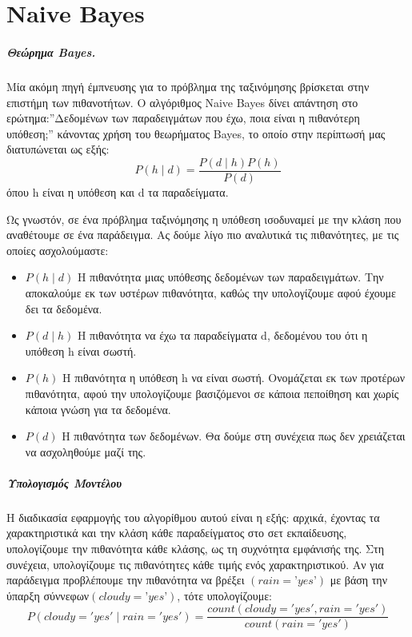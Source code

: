 \chapter{Naive Bayes}
\label{appendix:NBayes}
\paragraph{Θεώρημα Bayes.} Μία ακόμη πηγή έμπνευσης για το πρόβλημα της ταξινόμησης βρίσκεται στην επιστήμη των πιθανοτήτων. Ο αλγόριθμος Naive Bayes δίνει απάντηση στο ερώτημα:”Δεδομένων των
παραδειγμάτων που έχω, ποια είναι η πιθανότερη υπόθεση;” κάνοντας χρήση του θεωρήματος Bayes, το οποίο στην περίπτωσή μας διατυπώνεται ως εξής: 
$$P(h \mid d)= \frac{P(d \mid h) P(h)}{P(d)}$$
όπου h είναι η υπόθεση και d τα παραδείγματα.

Ως γνωστόν, σε ένα πρόβλημα ταξινόμησης η υπόθεση ισοδυναμεί με την κλάση που αναθέτουμε σε ένα παράδειγμα. Ας δούμε λίγο πιο αναλυτικά τις πιθανότητες, με τις οποίες ασχολούμαστε:
\begin{itemize}
	\item $P(h \mid d)$ Η πιθανότητα μιας υπόθεσης δεδομένων των παραδειγμάτων. Την αποκαλούμε εκ των υστέρων πιθανότητα, καθώς την υπολογίζουμε αφού έχουμε δει τα δεδομένα.
	\item $P(d \mid h)$ Η πιθανότητα να έχω τα παραδείγματα d, δεδομένου του ότι η υπόθεση h είναι σωστή.
	\item $P( h)$ Η πιθανότητα η υπόθεση h να είναι σωστή. Ονομάζεται εκ των προτέρων πιθανότητα, αφού την υπολογίζουμε βασιζόμενοι σε κάποια πεποίθηση και χωρίς κάποια γνώση για τα δεδομένα.
	\item $P(d)$ Η πιθανότητα των δεδομένων. Θα δούμε στη συνέχεια πως δεν χρειάζεται να ασχοληθούμε μαζί της.
\end{itemize}
\paragraph{Υπολογισμός Μοντέλου} Η διαδικασία εφαρμογής του αλγορίθμου αυτού είναι η εξής: αρχικά, έχοντας τα χαρακτηριστικά και την κλάση κάθε παραδείγματος στο σετ εκπαίδευσης, υπολογίζουμε την πιθανότητα κάθε κλάσης, ως τη συχνότητα εμφάνισής της. Στη συνέχεια, υπολογίζουμε τις πιθανότητες κάθε τιμής ενός χαρακτηριστικού. Αν για παράδειγμα προβλέπουμε την πιθανότητα να βρέξει $(rain=’yes’)$ με βάση την ύπαρξη σύννεφων$(cloudy=’yes’)$, τότε υπολογίζουμε:
$$P(cloudy= 'yes' \mid rain='yes')= \frac{count(cloudy='yes' , rain ='yes')}{count(rain='yes')}$$
